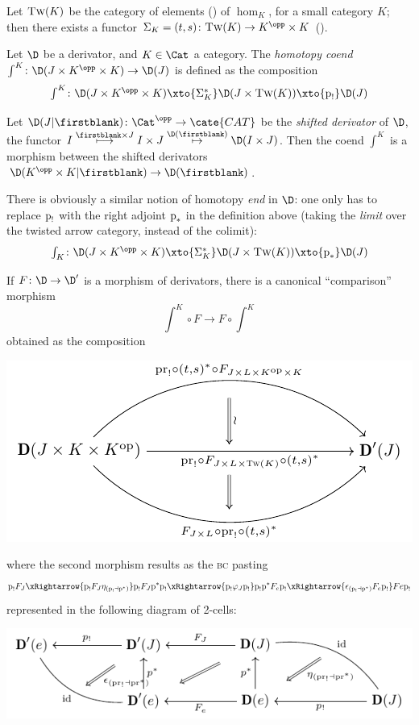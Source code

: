 Let $\textsc{Tw}(K)$ be the category of elements (\adef {}) of $\hom_K$, for a small category $K$; then there exists a functor $\Sigma_K = (t,s)\colon \textsc{Tw}(K)\to K^\opp\times K$ (\aprop {}). 
\begin{definition}\label{coendinder}
Let $\D$ be a derivator, and $K\in\Cat$ a category. The \emph{homotopy coend} $\int^K\colon \D(J\times K^\opp\times K)\to \D(J)$ is defined as the composition
\[\textstyle
\int^K\colon \D(J\times K^\opp\times K) \xto{\Sigma_K^*} \D(J\times \textsc{Tw}(K))\xto{\p_!} \D(J)
\]
\end{definition}
\begin{remark}
Let $\D(J|\firstblank)\colon \Cat^\opp \to \cate{CAT}$ be the \emph{shifted derivator} of $\D$, \ie the functor $I\overset{\firstblank\times J}\longmapsto I\times J \overset{\D(\firstblank)}\mapsto \D(I\times J)$. Then the coend $\int^K$ is a morphism between the shifted derivators $\D(K^\opp\times K|\firstblank)\to \D(\firstblank)$.
\end{remark}
\begin{remark}
There is obviously a similar notion of homotopy \emph{end} in $\D$: one only has to replace $\text{p}_!$ with the right adjoint $\text{p}_*$ in the definition above (taking the \emph{limit} over the twisted arrow category, instead of the colimit):
\[\textstyle 
\int_K  \colon \D(J\times K^\opp\times K) \xto{\Sigma_K^*} \D(J\times \textsc{Tw}(K))\xto{\p_*} \D(J)
\]
\end{remark}
\begin{lemma}
If $F\colon \D\to \D'$ is a morphism of derivators, there is a canonical ``comparison'' morphism
\[\textstyle 
\int^K \circ F \to F\circ \int^K
\]
obtained as the composition
\begin{center}
\includegraphics[scale=1]{figures/fig9}
\end{center}
where the second morphism results as the \textsc{bc} pasting
\[
\p_! F_J \xRightarrow{\p_! F_J \eta_{(\p_!\dashv \p^*)}}
\p_! F_J \p^*\p_! \xRightarrow{\p_! \varphi_J\p_!}
\p_! \p^* F_e\p_! \xRightarrow{\epsilon_{(\p_!\dashv \p^*)}F_e\p_!} Fe \p_!
\]
represented in the following diagram of 2-cells:
\begin{center}
\includegraphics[scale=1]{figures/fig10}
\end{center}
\end{lemma}
